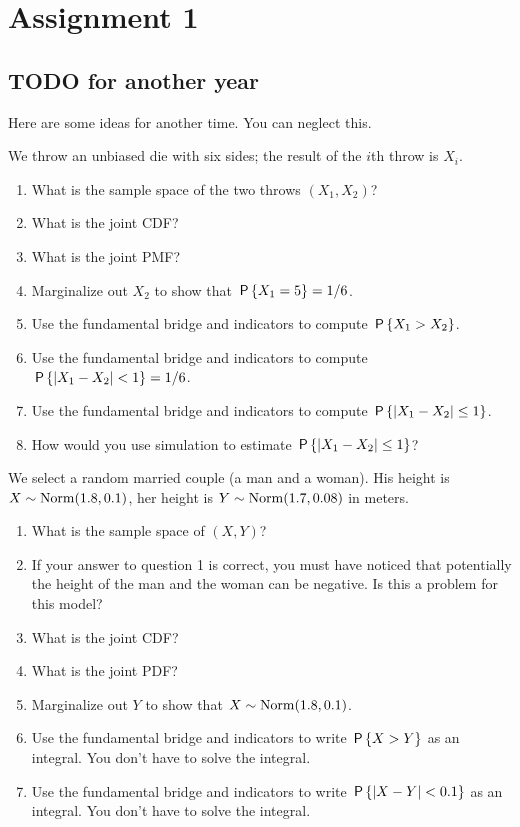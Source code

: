 \documentclass[../../assignments/assignments]{subfiles}
\begin{document}
\section{Assignment 1}


\subsection{TODO for another year}

Here are some ideas for another time. You can neglect this.



\begin{exercise}
We throw an unbiased die with six sides; the result of the $i$th throw is $X_i$.
\begin{enumerate}
\item What is the sample space of the two throws $(X_{1}, X_2)$?
\item What is the joint CDF?
\item What is the joint PMF?
\item  Marginalize out $X_2$ to show that $\P{X_1=5} = 1/6$.
\item Use the fundamental bridge and indicators to compute $\P{X_1>X_2}$.
\item Use the fundamental bridge and indicators to compute $\P{|X_1-X_2| < 1 } = 1/6$.
\item Use the fundamental bridge and indicators to compute $\P{|X_1-X_2|\leq 1 }$.
\item How would you use simulation to estimate  $\P{|X_1-X_2|\leq 1 }$?
\end{enumerate}
\end{exercise}

\begin{exercise}
We select a random married couple (a man and a woman). His height is $X\sim \Norm{1.8, 0.1}$, her height is $Y\sim \Norm{1.7, 0.08}$ in meters.
\begin{enumerate}
\item What is the sample space of $(X, Y)$?
\item If your answer to question 1 is correct, you must have noticed that potentially the height of the man and the woman can be negative. Is this a problem for this model?
\item What is the joint CDF?
\item What is the joint PDF?
\item  Marginalize out $Y$ to show that $X\sim \Norm{1.8, 0.1}$.
\item Use the fundamental bridge and indicators to write  $\P{X>Y}$ as an integral. You don't have to solve the integral.
\item Use the fundamental bridge and indicators to write  $\P{|X-Y| < 0.1 }$ as an integral. You don't have to solve the integral.
\end{enumerate}
\end{exercise}
\end{document}
